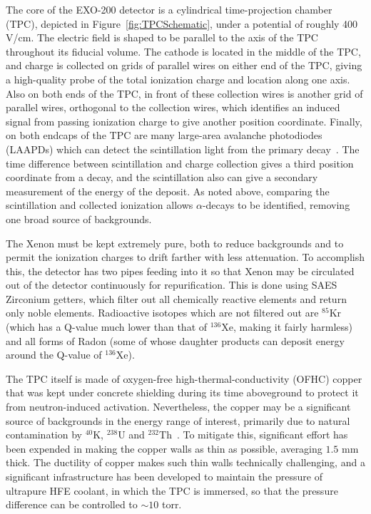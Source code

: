The core of the EXO-200 detector is a cylindrical time-projection chamber (TPC), depicted in Figure~\ref{fig:TPCSchematic}, under a potential of roughly 400 V/cm.  The electric field is shaped to be parallel to the axis of the TPC throughout its fiducial volume.  The cathode is located in the middle of the TPC, and charge is collected on grids of parallel wires on either end of the TPC, giving a high-quality probe of the total ionization charge and location along one axis.  Also on both ends of the TPC, in front of these collection wires is another grid of parallel wires, orthogonal to the collection wires, which identifies an induced signal from passing ionization charge to give another position coordinate.  Finally, on both endcaps of the TPC are many large-area avalanche photodiodes (LAAPDs) which can detect the scintillation light from the primary decay~\cite{EXOLAAPD}.  The time difference between scintillation and charge collection gives a third position coordinate from a decay, and the scintillation also can give a secondary measurement of the energy of the deposit.  As noted above, comparing the scintillation and collected ionization allows $\alpha$-decays to be identified, removing one broad source of backgrounds.

The Xenon must be kept extremely pure, both to reduce backgrounds and to permit the ionization charges to drift farther with less attenuation.  To accomplish this, the detector has two pipes feeding into it so that Xenon may be circulated out of the detector continuously for repurification.  This is done using SAES Zirconium getters, which filter out all chemically reactive elements and return only noble elements.  Radioactive isotopes which are not filtered out are $^{85}$Kr (which has a Q-value much lower than that of $^{136}$Xe, making it fairly harmless) and all forms of Radon (some of whose daughter products can deposit energy around the Q-value of $^{136}$Xe).

The TPC itself is made of oxygen-free high-thermal-conductivity (OFHC) copper that was kept under concrete shielding during its time aboveground to protect it from neutron-induced activation.  Nevertheless, the copper may be a significant source of backgrounds in the energy range of interest, primarily due to natural contamination by $^{40}$K, $^{238}$U and $^{232}$Th~\cite{MaterialsCatalog}.  To mitigate this, significant effort has been expended in making the copper walls as thin as possible, averaging $1.5$ mm thick.  The ductility of copper makes such thin walls technically challenging, and a significant infrastructure has been developed to maintain the pressure of ultrapure HFE coolant, in which the TPC is immersed, so that the pressure difference can be controlled to $\sim 10$ torr.

